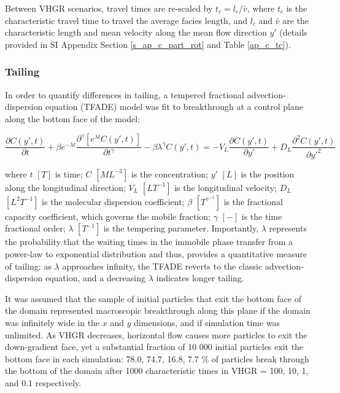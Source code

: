 Between VHGR scenarios, travel times are re-scaled by $t_c = l_c / \bar{v}$, where $t_c$ is the characteristic travel time to travel the average facies length, and $l_c$ and $\bar{v}$ are the characteristic length and mean velocity along the mean flow direction $y'$ (details provided in SI Appendix Section \ref{s_ap_c_part_rot} and Table \ref{ap_c_tc}). 


%
%
\subsubsection{Tailing}
\label{ss_tailing}

In order to quantify differences in tailing, a tempered fractional advection-dispersion equation (TFADE) model \citep{meerschaert2008tempered} was fit to breakthrough at a control plane along the bottom face of the model:

\begin{equation}
\label{eq:tfade}
    \frac{\partial C(y', t)}{\partial t}+\beta e^{-\lambda t} \frac{\partial^{\gamma}\left[e^{\lambda t} C(y', t)\right]}{\partial t^{\gamma}}-\beta \lambda^{\gamma} C(y', t)=-V_{L} \frac{\partial C(y', t)}{\partial y'}+D_{L} \frac{\partial^{2} C(y', t)}{\partial y'^{2}}
\end{equation}

where $t$ $[T]$ is time; $C$ $[ML^{-3}]$ is the concentration; $y'$ $[L]$ is the position along the longitudinal direction; $V_L$ $[LT^{-1}]$ is the longitudinal velocity; $D_L$ $[L^2T^{-1}]$ is the molecular dispersion coefficient; $\beta$ $[T^{\gamma^{-1}}]$ is the fractional capacity coefficient, which governs the mobile fraction; $\gamma$ $[-]$ is the time fractional order; $\lambda$ $[T^{-1}]$ is the tempering parameter. Importantly, $\lambda$ represents the probability that the waiting times in the immobile phase transfer from a power‐law to exponential distribution and thus, provides a quantitative measure of tailing: as $\lambda$ approaches infinity, the TFADE reverts to the classic advection-dispersion equation, and a decreasing $\lambda$ indicates longer tailing. 

It was assumed that the sample of initial particles that exit the bottom face of the domain represented macroscopic breakthrough along this plane if the domain was infinitely wide in the $x$ and $y$ dimensions, and if simulation time was unlimited. As VHGR decreases, horizontal flow causes more particles to exit the down-gradient face, yet a substantial fraction of 10 000 initial particles exit the bottom face in each simulation: 78.0, 74.7, 16.8, 7.7 \% of particles break through the bottom of the domain after 1000 characteristic times in VHGR = 100, 10, 1, and 0.1 respectively. 


